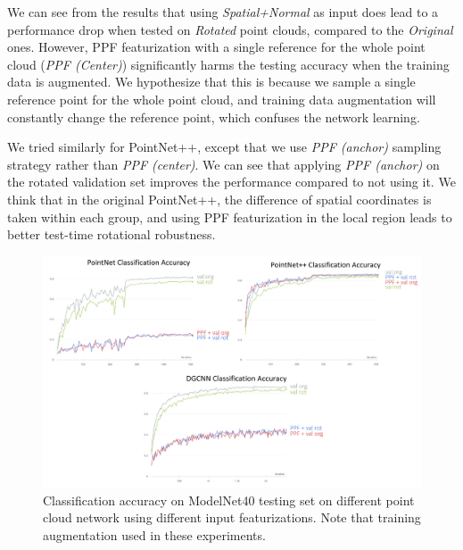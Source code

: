 \documentclass{article}
\begin{document}
We can see from the results that using \textit{Spatial+Normal} as input does lead to a performance drop when tested on \textit{Rotated} point clouds, compared to the \textit{Original} ones. 
However, PPF featurization with a single reference for the whole point cloud (\textit{PPF (Center)}) significantly harms the testing accuracy when the training data is augmented. We hypothesize that this is because we sample a single reference point for the whole point cloud, and training data augmentation will constantly change the reference point, which confuses the network learning. 

We tried similarly for PointNet++, except that we use \textit{PPF (anchor)} sampling strategy rather than \textit{PPF (center)}. We can see that applying \textit{PPF (anchor)} on the rotated validation set improves the performance compared to not using it. We think that in the original PointNet++, the difference of spatial coordinates is taken within each group, and using PPF featurization in the local region leads to better test-time rotational robustness. 

\begin{figure}[ht!]
    \centering
    \includegraphics[width=\textwidth]{images/aug_combined.png}
\caption{Classification accuracy on ModelNet40 testing set on different point cloud network using different input featurizations. Note that training augmentation used in these experiments.}
\end{figure}
\end{document}

